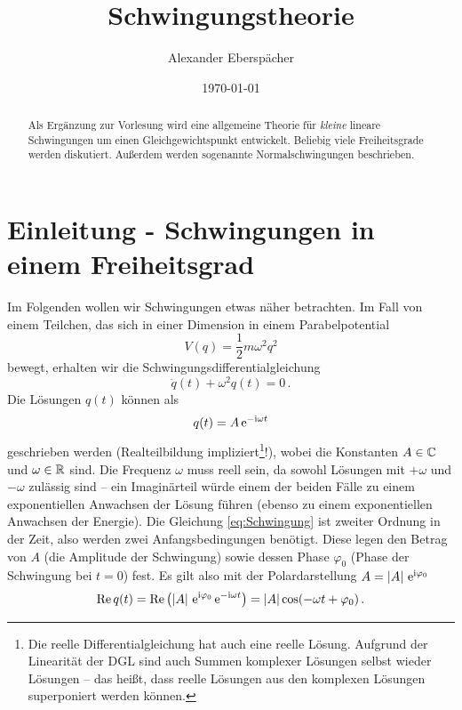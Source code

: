 \documentclass[paper=a4, fontsize=11.0pt, abstractoff, DIV12]{scrartcl}
\title{Schwingungstheorie}
\author{Alexander Eberspächer}
\date{\today}
\begin{document}
\maketitle
\begin{abstract}
Als Ergänzung zur Vorlesung wird eine allgemeine Theorie für \emph{kleine}
lineare Schwingungen um einen Gleichgewichtspunkt entwickelt. Beliebig viele
Freiheitsgrade werden diskutiert. Außerdem werden sogenannte
Normalschwingungen beschrieben.
\end{abstract}

\section{Einleitung - Schwingungen in einem Freiheitsgrad}

Im Folgenden wollen wir Schwingungen etwas näher betrachten. Im Fall von
einem Teilchen, das sich in einer Dimension in einem Parabelpotential
\begin{equation}
V(q) = \frac{1}{2} m \omega^2 q^2
\label{eq:Pot}
\end{equation}
bewegt, erhalten wir die Schwingungsdifferentialgleichung
\begin{equation}
\ddot{q}(t) + \omega^2 q(t) = 0 \, .
\label{eq:Schwingung}
\end{equation}
Die Lösungen $q(t)$ können als
\begin{equation}
q(t) = A\,{\mathrm{e}}^{-\mathrm{i} \omega t}
\end{equation}
geschrieben werden (Realteilbildung impliziert\footnote{Die reelle
Differentialgleichung hat auch eine reelle Lösung. Aufgrund der Linearität
der DGL sind auch Summen komplexer Lösungen selbst wieder Lösungen -- das
heißt, dass reelle Lösungen aus den komplexen Lösungen superponiert werden
können.}!), wobei die Konstanten $A \in \mathbb{C}$ und $\omega \in \mathbb{R}$
sind. Die Frequenz $\omega$ muss reell sein, da sowohl Lösungen mit $+\omega$
und $-\omega$ zulässig sind -- ein Imaginärteil würde einem der beiden
Fälle zu einem exponentiellen Anwachsen der Lösung führen (ebenso zu einem
exponentiellen Anwachsen der Energie). Die Gleichung \eqref{eq:Schwingung}
ist zweiter Ordnung in der Zeit, also werden zwei Anfangsbedingungen
benötigt. Diese legen den Betrag von $A$ (die Amplitude der Schwingung)
sowie dessen Phase $\varphi_0$ (Phase der Schwingung bei $t=0$) fest. Es
gilt also mit der Polardarstellung $A = \left\vert A \right\vert\,{\mathrm{e}}^{\mathrm{i}\varphi_0}$
\begin{equation}
\operatorname{Re} q(t) = \operatorname{Re}\left( \left\vert A \right\vert\,{\mathrm{e}}^{\mathrm{i}\varphi_0}\,{\mathrm{e}}^{-\mathrm{i}\omega t}\right) = \left\vert A \right\vert \cos(-\omega t + \varphi_0)\, .
\end{equation}
\end{document}
